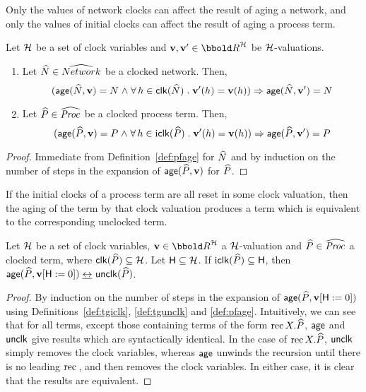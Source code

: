 Only the values of network clocks can affect the result of aging a 
network, and only the values of initial clocks can affect the 
result of aging a process term. 
\begin{lemma}\label{lem:pfage}
Let $\clocks$ be a set of clock variables and $\clkvl,\clkvl' \in \clkvls$
be $\clocks$-valuations.
\begin{enumerate}
\item Let ${\widehat{N}} \in \widehat{Network_{}}$ be a clocked network. Then,
\[
(\age(\NN,\clkvl) = \N \land 
\forall \clock \in \clk(\NN) \such \clkvl'(\clock) = \clkvl(\clock)) 
\implies \age(\NN,\clkvl') = \N
\]
\item Let ${\widehat{P}} \in \widehat{\text{\it Proc\/}_{}}$ be a clocked process term. Then,
\[
(\age(\PP,\clkvl) = \P \land
\forall \clock \in \iclk(\PP) \such \clkvl'(\clock) = \clkvl(\clock)) 
\implies \age(\PP,\clkvl') = \P
\]
\end{enumerate}
\end{lemma}
\begin{proof}
Immediate from Definition~\ref{def:pfage} for ${\widehat{N}}$ and by 
induction on the number of steps in the expansion of $\mathop{\sf age}({\widehat{P}},\mathbf{v})$
for ${\widehat{P}}$.
\end{proof}

If the initial clocks of a process term are all reset in some clock
valuation, then the aging of the term by that clock valuation produces
a term which is equivalent to the corresponding unclocked term. 
\begin{lemma}\label{lem:pfprocage}
Let $\clocks$ be a set of clock variables,
$\clkvl \in \clkvls$ a $\clocks$-valuation and ${\widehat{P}} \in
\widehat{\text{\it Proc\/}_{}}$ a clocked term, where $\clk(\PP) \subseteq \clocks$. 
Let $\someclks \subseteq \clocks$. If ${\mathop{\mathrm{i}{\sf clk}}}({\widehat{P}}) \subseteq {\sf H}$, then
$\mathop{\sf age}({\widehat{P}},\mathbf{v}[{\sf H}:=0]) \mathrel{\underline{\leftrightarrow}^{}_{}} {\mathop{{\sf unclk}}}({\widehat{P}})$.
\end{lemma}
\begin{proof}
By induction on the number of steps in the expansion of
$\mathop{\sf age}({\widehat{P}},\mathbf{v}[{\sf H}:=0])$ using
Definitions~\ref{def:tgiclk}, \ref{def:tgunclk} and \ref{def:pfage}.
Intuitively, we can see that for all terms, except those containing
terms of the form $\mathrm{rec\,} X.{\widehat{P}}$, $\mathop{\sf age}$ and ${\mathop{{\sf unclk}}}$ give
results which are syntactically identical. In the case of $\mathrm{rec\,}
X.{\widehat{P}}$, ${\mathop{{\sf unclk}}}$ simply removes the clock variables, whereas $\mathop{\sf age}$ 
unwinds the recursion until there is no leading $\mathrm{rec\,}$, and then
removes the clock variables. In either case, it is clear that the results 
are equivalent.
\end{proof}

